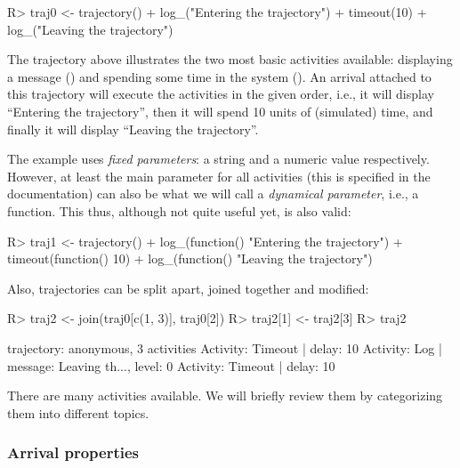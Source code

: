 \documentclass[
  nojss]{jss}
\begin{document}
\begin{CodeChunk}
\begin{CodeInput}
R> traj0 <- trajectory() %
+   log_("Entering the trajectory") %
+   timeout(10) %
+   log_("Leaving the trajectory")
\end{CodeInput}
\end{CodeChunk}

The trajectory above illustrates the two most basic activities
available: displaying a message () and spending some time
in the system (). An arrival attached to this trajectory
will execute the activities in the given order, i.e., it will display
``Entering the trajectory'', then it will spend 10 units of (simulated)
time, and finally it will display ``Leaving the trajectory''.

The example uses \emph{fixed parameters}: a string and a numeric value
respectively. However, at least the main parameter for all activities
(this is specified in the documentation) can also be what we will call a
\emph{dynamical parameter}, i.e., a function. This thus, although not
quite useful yet, is also valid:

\begin{CodeChunk}
\begin{CodeInput}
R> traj1 <- trajectory() %
+   log_(function() "Entering the trajectory") %
+   timeout(function() 10) %
+   log_(function() "Leaving the trajectory")
\end{CodeInput}
\end{CodeChunk}

Also, trajectories can be split apart, joined together and modified:

\begin{CodeChunk}
\begin{CodeInput}
R> traj2 <- join(traj0[c(1, 3)], traj0[2])
R> traj2[1] <- traj2[3]
R> traj2
\end{CodeInput}
\begin{CodeOutput}
trajectory: anonymous, 3 activities
{ Activity: Timeout      | delay: 10 }
{ Activity: Log          | message: Leaving th..., level: 0 }
{ Activity: Timeout      | delay: 10 }
\end{CodeOutput}
\end{CodeChunk}

There are many activities available. We will briefly review them by
categorizing them into different topics.

\hypertarget{arrival-properties}{%
\subsubsection{Arrival properties}\label{arrival-properties}}
\end{document}
